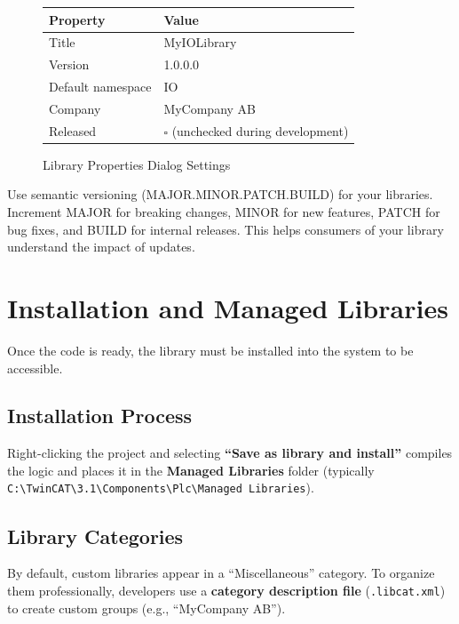 \documentclass[11pt,a4paper]{article}
\begin{document}
\begin{figure}[h]
\centering
\begin{tabular}{|l|l|}
\hline
\textbf{Property} & \textbf{Value} \\
\hline
Title & MyIOLibrary \\
Version & 1.0.0.0 \\
Default namespace & IO \\
Company & MyCompany AB \\
Released & $\square$ (unchecked during development) \\
\hline
\end{tabular}
\caption{Library Properties Dialog Settings}
\end{figure}

\begin{tipbox}
Use semantic versioning (MAJOR.MINOR.PATCH.BUILD) for your libraries. Increment MAJOR for breaking changes, MINOR for new features, PATCH for bug fixes, and BUILD for internal releases. This helps consumers of your library understand the impact of updates.
\end{tipbox}

\section{Installation and Managed Libraries}

Once the code is ready, the library must be installed into the system to be accessible.

\subsection{Installation Process}

Right-clicking the project and selecting \textbf{``Save as library and install''} compiles the logic and places it in the \textbf{Managed Libraries} folder (typically \texttt{C:\textbackslash TwinCAT\textbackslash 3.1\textbackslash Components\textbackslash Plc\textbackslash Managed Libraries}).

\subsection{Library Categories}

By default, custom libraries appear in a ``Miscellaneous'' category. To organize them professionally, developers use a \textbf{category description file} (\texttt{.libcat.xml}) to create custom groups (e.g., ``MyCompany AB'').
\end{document}
